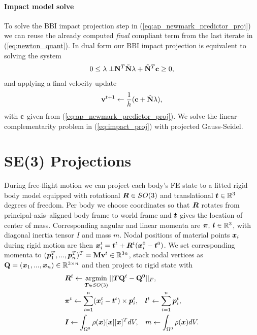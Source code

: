 \paragraph*{Impact model solve}
To solve the BBI impact projection step in (\ref{eq:ap_newmark_predictor_proj}) we can reuse the already computed \emph{final} compliant term from the last iterate in (\ref{eq:newton_quant}). In dual form our BBI impact projection is equivalent to solving the system 
\begin{align}
\begin{split}
0 \leq \lambda \perp & \mathbf {N}^T \tilde{\mathbf {N}} \lambda  + \tilde{\mathbf {N}}^T \mathbf {c} \geq 0,\\
\label{eq:impact_proj}
\end{split}
\end{align}
and applying a final velocity update 
\begin{align}
\mathbf {v}^{t+1} \leftarrow \frac{1}{h} (\mathbf {c} + \tilde{\mathbf {N}} \lambda),  
\end{align}
with $\mathbf {c}$ given from (\ref{eq:ap_newmark_predictor_proj}). We solve the linear-complementarity problem in (\ref{eq:impact_proj}) with projected Gauss-Seidel. 
\section{SE(3) Projections}

During free-flight motion we can project each body's FE state to a fitted rigid body model equipped with rotational $\bm{R} \in SO(3)$ and translational $\bm{t} \in \mathbb{R}^3$ degrees of freedom. Per body we choose coordinates so that $\bm{R}$ rotates from principal-axis--aligned body frame to world frame and $\bm{t}$ gives the location of center of mass.
Corresponding angular and linear momenta are $\bm{\pi}, \> \bm{l} \in \mathbb{R}^3$, with diagonal inertia tensor $I$ and mass $m$. Nodal positions of material points $\bm{x}_i$ during rigid motion are then $\bm{x}^t_i = \bm{t}^t + \bm{R}^t (\bm{x}^0_i - \bm{t}^0)$. We set corresponding momenta 
to $(\bm{p}_1^T, ..., \bm{p}_n^T)^T  = \mathbf {M} \mathbf {v}^t \in \mathbb{R}^{3n}$, stack nodal vertices as $\mathbf {Q} = (\bm{x}_1, ..., \bm{x}_n) \in \mathbb{R}^{3 \times n}$ and then project to rigid state with
%
\begin{align}
\begin{split}
\label{eq:FE_to_SE3}
&\bm{R}^t \leftarrow \mathop{\rm argmin}_{\bm{T} \in SO(3)} || \bm{T} \mathbf {Q}^t  - \mathbf {Q}^0 ||_F,\\
&\bm{\pi}^t \leftarrow \sum_{i = 1}^n (\bm{x}_i^t - \bm{t}^t) \times \bm{p}^t_i, \> \>  \> \> \bm{l}^t \leftarrow \sum_{i= 1}^n \bm{p}^t_i, \\
&\bm{I}  \leftarrow \int_{\Omega^0} \rho(\bm{x}) [\bm{x}] [\bm{x}]^T  dV, \> \> \> \> m  \leftarrow \int_{\Omega^0} \rho(\bm{x}) dV.
\end{split}
\end{align}

